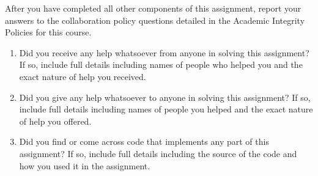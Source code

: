 \documentclass[11pt,addpoints,answers]{exam}
\numberwithin{equation}{section} %
\numberwithin{figure}{section} %
\numberwithin{table}{section} %
\begin{document}
    After you have completed all other components of this assignment, report your answers to the collaboration policy questions detailed in the Academic Integrity Policies for this course.
    \begin{enumerate}
        \item Did you receive any help whatsoever from anyone in solving this assignment? If so, include full details including names of people who helped you and the exact nature of help you received.
        
        \begin{tcolorbox}[fit,height=4cm, width=15cm, blank, borderline={1pt}{-2pt},nobeforeafter]
       \end{tcolorbox}
        \item Did you give any help whatsoever to anyone in solving this assignment? If so, include full details including names of people you helped and the exact nature of help you offered.
        
        \begin{tcolorbox}[fit,height=4cm, width=15cm, blank, borderline={1pt}{-2pt},nobeforeafter]
       \end{tcolorbox}
        \item Did you find or come across code that implements any part of this assignment? If so, include full details including the source of the code and how you used it in the assignment.
        
        \begin{tcolorbox}[fit,height=4cm, width=15cm, blank, borderline={1pt}{-2pt},nobeforeafter]
       \end{tcolorbox}
    \end{enumerate}
\end{document}
